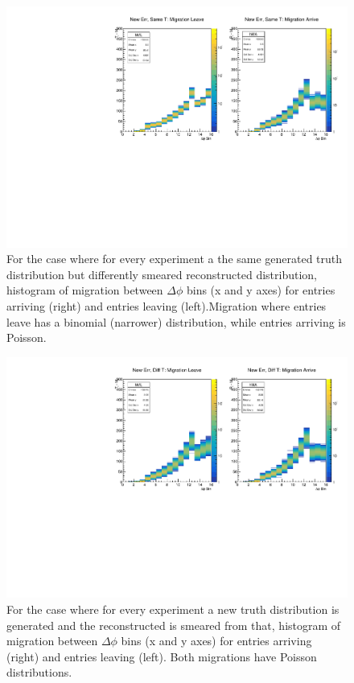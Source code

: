 \begin{figure}
	\centering
	\includegraphics[width=1.0\textwidth]{figures/c3_same.pdf} 
	\caption{ For the case where for every experiment a the same generated truth distribution but differently smeared reconstructed distribution, histogram of migration between $\Delta\phi$ bins (x and y axes) for entries arriving (right) and entries leaving (left).Migration where entries leave has a binomial (narrower) distribution, while entries arriving is Poisson. }	
	\label{fig:mig_same}
\end{figure}

\begin{figure}
	\centering
	\includegraphics[width=1.0\textwidth]{figures/c3_diff.pdf} 
	\caption{ For the case where for every experiment a new truth distribution is generated and the reconstructed is smeared from that, histogram of migration between $\Delta\phi$ bins (x and y axes) for entries arriving (right) and entries leaving (left). Both migrations have Poisson distributions. }	
	\label{fig:mig_diff}
\end{figure}

